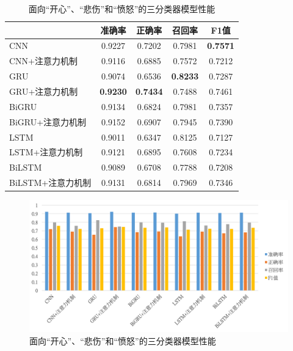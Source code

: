 \begin{table}[htb]
  \centering
  \begin{minipage}[t]{0.8\linewidth}
  \caption{面向“开心”、“悲伤”和“愤怒”的三分类器模型性能}
  \label{tab:exp_context_emo_b_result}
    \begin{tabularx}{\linewidth}{X|cccc}
    \toprule[1.5pt]
    & 准确率 & 正确率 & 召回率 & F1值 \\
    \hline
    CNN & 0.9227 & 0.7202 & 0.7981 & \bf 0.7571 \\ %
    CNN+注意力机制 & 0.9116 & 0.6885 & 0.7572 & 0.7212 \\ %
    \hline
    GRU & 0.9074 & 0.6536 & \bf 0.8233 & 0.7287 \\ %
    GRU+注意力机制 & \bf 0.9230 & \bf 0.7434 & 0.7488 & 0.7461 \\ %
    \hline
    BiGRU & 0.9134 & 0.6824 & 0.7981 & 0.7357 \\ %
    BiGRU+注意力机制 & 0.9152 & 0.6907 & 0.7945 & 0.7390 \\ %
    \hline
    LSTM & 0.9011 & 0.6347 & 0.8125 & 0.7127 \\ %
    LSTM+注意力机制 & 0.9121 & 0.6895 & 0.7608 & 0.7234 \\ %
    \hline
    BiLSTM & 0.9089 & 0.6708 & 0.7788 & 0.7208 \\ %
    BiLSTM+注意力机制 & 0.9131 & 0.6814 & 0.7969 & 0.7346 \\ %
    \bottomrule[1.5pt]
    \end{tabularx}
  \end{minipage}
\end{table}

\begin{figure}[H]
  \centering
  \includegraphics[width=\textwidth]{img/exp_context_emo_b_result_bar.png}
  \caption{面向“开心”、“悲伤”和“愤怒”的三分类器模型性能}
  \label{fig:exp_context_emo_b_result_bar}
\end{figure}

